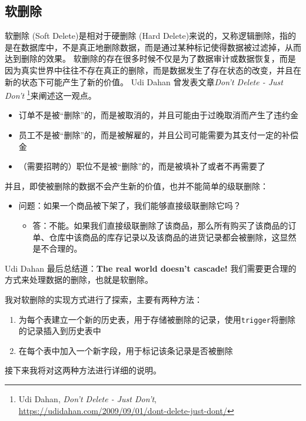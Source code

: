 \documentclass[a4paper,10pt]{ctexart}
\begin{document}
\subsection{软删除}

软删除 (Soft Delete)是相对于硬删除 (Hard Delete)来说的，又称逻辑删除，指的是在数据库中，不是真正地删除数据，而是通过某种标记使得数据被过滤掉，从而达到删除的效果。
软删除的存在很多时候不仅是为了数据审计或数据恢复，而是因为真实世界中往往不存在真正的删除，而是数据发生了存在状态的改变，并且在新的状态下可能产生了新的价值。
Udi Dahan 曾发表文章\textit{Don't Delete - Just Don't} \footnote{Udi Dahan, \textit{Don't Delete - Just Don't}, \url{https://udidahan.com/2009/09/01/dont-delete-just-dont/}}来阐述这一观点。
\begin{itemize}
    \item 订单不是被“删除”的，而是被取消的，并且可能由于过晚取消而产生了违约金
    \item 员工不是被“删除”的，而是被解雇的，并且公司可能需要为其支付一定的补偿金
    \item （需要招聘的）职位不是被“删除”的，而是被填补了或者不再需要了
\end{itemize}

\vspace{0.7cm}
并且，即使被删除的数据不会产生新的价值，也并不能简单的级联删除：
\begin{itemize}
    \item 问题：如果一个商品被下架了，我们能够直接级联删除它吗？
    \begin{itemize}
        \item 答：不能。如果我们直接级联删除了该商品，那么所有购买了该商品的订单、仓库中该商品的库存记录以及该商品的进货记录都会被删除，这显然是不合理的。
    \end{itemize}
\end{itemize}

Udi Dahan 最后总结道：\textbf{The real world doesn't cascade!} 
我们需要更合理的方式来处理数据的删除，也就是软删除。

我对软删除的实现方式进行了探索，主要有两种方法：
\begin{enumerate}
    \item 为每个表建立一个新的历史表，用于存储被删除的记录，使用\texttt{trigger}将删除的记录插入到历史表中
    \item 在每个表中加入一个新字段，用于标记该条记录是否被删除
\end{enumerate}

接下来我将对这两种方法进行详细的说明。
\end{document}

